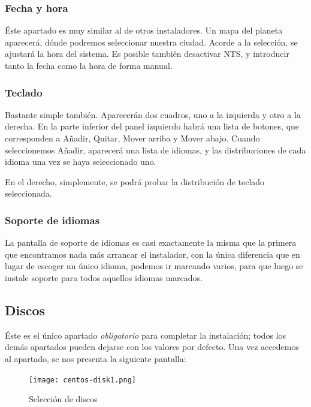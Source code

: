 \subsubsection{Fecha y hora}
\label{subsec:fechahora}

Éste apartado es muy similar al de otros instaladores. Un mapa del planeta aparecerá, dónde podremos seleccionar nuestra ciudad. Acorde a la selección, se ajustará la hora del sistema. Es posible también desactivar NTS, y introducir tanto la fecha como la hora de forma manual.

\subsubsection{Teclado}
\label{subsec:teclado}

Bastante simple también. Aparecerán dos cuadros, uno a la izquierda y otro a la derecha. En la parte inferior del panel izquierdo habrá una lista de botones, que corresponden a Añadir, Quitar, Mover arriba y Mover abajo. Cuando seleccionemos Añadir, aparecerá una lista de idiomas, y las distribuciones de cada idioma una vez se haya seleccionado uno.

En el derecho, simplemente, se podrá probar la distribución de teclado seleccionada.

\subsubsection{Soporte de idiomas}
\label{subsec:soportedeidiomas}

La pantalla de soporte de idiomas es casi exactamente la misma que la primera que encontramos nada más arrancar el instalador, con la única diferencia que en lugar de escoger un único idioma, podemos ir marcando varios, para que luego se instale soporte para todos aquellos idiomas marcados.

\subsection{Discos}
\label{subsec:discos}

Éste es el único apartado \emph{obligatorio} para completar la instalación; todos los demás apartados pueden dejarse con los valores por defecto. Una vez accedemos al apartado, se nos presenta la siguiente pantalla:

\begin{figure}[ht!]
  \centering
  \texttt{[image: centos-disk1.png]}
  \caption{\label{fig:diskselect} Selección de discos}
\end{figure}

